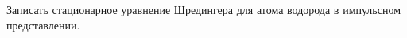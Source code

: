 \begin{leftrules}
	Записать стационарное уравнение Шредингера для атома водорода в импульсном представлении.
\end{leftrules}